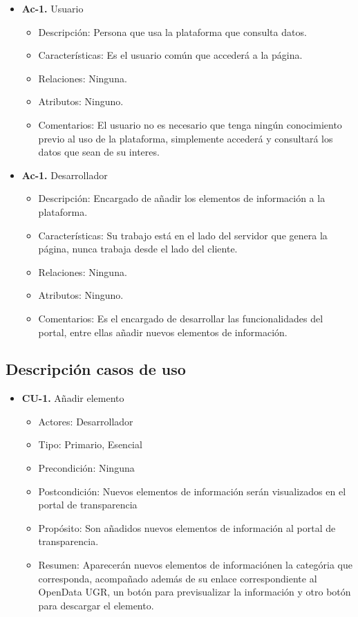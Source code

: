 \begin{itemize}
  \item \textbf{Ac-1.} Usuario
  \begin{itemize}
   \item Descripción: Persona que usa la plataforma que consulta datos.
   \item Características: Es el usuario común que accederá a la página.
   \item Relaciones: Ninguna.
   \item Atributos: Ninguno.
   \item Comentarios: El usuario no es necesario que tenga ningún conocimiento previo al uso de la plataforma, simplemente
   accederá y consultará los datos que sean de su interes.
  \end{itemize}
    \item \textbf{Ac-1.} Desarrollador
  \begin{itemize}
   \item Descripción: Encargado de añadir los elementos de información a la plataforma.
   \item Características: Su trabajo está en el lado del servidor que genera la página, nunca trabaja desde el lado del cliente.
   \item Relaciones: Ninguna.
   \item Atributos: Ninguno.
   \item Comentarios: Es el encargado de desarrollar las funcionalidades del portal, entre ellas añadir nuevos elementos de
   información.
  \end{itemize}
\end{itemize}

\newpage
\subsection{Descripción casos de uso}

\begin{itemize}
 \item \textbf{CU-1.} Añadir elemento
 \begin{itemize}
  \item Actores: Desarrollador
  \item Tipo: Primario, Esencial
  \item Precondición: Ninguna
  \item Postcondición: Nuevos elementos de información serán visualizados en el portal de transparencia
  \item Propósito: Son añadidos nuevos elementos de información al portal de transparencia.
  \item Resumen: Aparecerán nuevos elementos de informaciónen la categória que corresponda, acompañado además de su enlace
  correspondiente al OpenData UGR, un botón para previsualizar la información y otro botón para descargar el elemento.
 \end{itemize}
\end{itemize}

